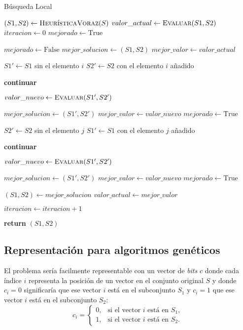 \documentclass[12pt,letterpaper]{article}
\begin{document}
\begin{algorithm}[htp]
    \caption{Búsqueda Local}
    \begin{algorithmic}[1]
        \State $(S1, S2) \gets \textsc{HeurísticaVoraz}(S)$
        \State $valor\_actual \gets \textsc{Evaluar}(S1, S2)$
        \State $iteracion \gets 0$
        \State $mejorado \gets \text{True}$

        \State $mejorado \gets \text{False}$
        \State $mejor\_solucion \gets (S1, S2)$
        \State $mejor\_valor \gets valor\_actual$

        \State $S1' \gets S1$ sin el elemento $i$
        \State $S2' \gets S2$ con el elemento $i$ añadido

        \State \textbf{continuar}
        \EndIf

        \State $valor\_nuevo \gets \textsc{Evaluar}(S1', S2')$

        \State $mejor\_solucion \gets (S1', S2')$
        \State $mejor\_valor \gets valor\_nuevo$
        \State $mejorado \gets \text{True}$
        \EndIf
        \EndFor

        \State $S2' \gets S2$ sin el elemento $j$
        \State $S1' \gets S1$ con el elemento $j$ añadido

        \State \textbf{continuar}
        \EndIf

        \State $valor\_nuevo \gets \textsc{Evaluar}(S1', S2')$

        \State $mejor\_solucion \gets (S1', S2')$
        \State $mejor\_valor \gets valor\_nuevo$
        \State $mejorado \gets \text{True}$
        \EndIf
        \EndFor

        \State $(S1, S2) \gets mejor\_solucion$
        \State $valor\_actual \gets mejor\_valor$
        \EndIf

        \State $iteracion \gets iteracion + 1$
        \EndWhile

        \State \textbf{return} $(S1, S2)$
        \EndProcedure
    \end{algorithmic}
\end{algorithm}

\subsection{Representación para algoritmos genéticos}
El problema sería facilmente representable con un vector de \textit{bits} $c$ donde cada índice $i$ representa la posición de un vector en el conjunto original $S$ y donde $c_i=0$ significaría que ese vector $i$ está en el subconjunto $S_1$ y $c_i=1$ que ese vector $i$ está en el subconjunto $S_2$:
\[
c_i = 
\begin{cases}
0, & \text{si el vector } i \text{ está en } S_1, \\
1, & \text{si el vector } i \text{ está en } S_2.
\end{cases}
\]
\end{document}
